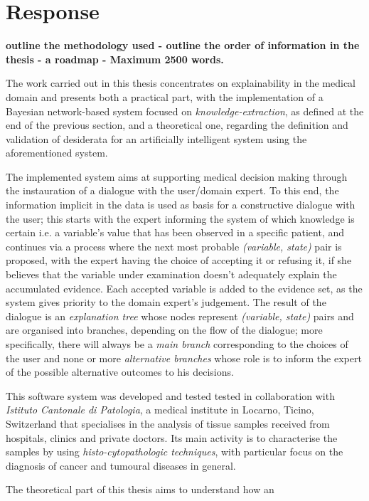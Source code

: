 
\section{Response}
\textbf{outline the methodology used - 
outline the order of information in the thesis - a roadmap - Maximum 2500 words.}

The work carried out in this thesis concentrates on explainability in the medical domain and presents both a practical part, with the implementation of a Bayesian network-based system focused on \textit{knowledge-extraction}, as defined at the end of the previous section, and a theoretical one, regarding the definition and validation of desiderata for an artificially intelligent system using the aforementioned system.

The implemented system aims at supporting medical decision making through the instauration of a dialogue with the user/domain expert.  To this end, the information implicit in the data is used as basis for a constructive dialogue with the user; this starts with the expert informing the system of which knowledge is certain i.e. a variable's value that has been observed in a specific patient, and continues via a process where the next most probable \textit{(variable, state)} pair is proposed, with the expert having the choice of accepting it or refusing it, if she believes that the variable under examination doesn't adequately explain the accumulated evidence.  Each accepted variable is added to the evidence set, as the system gives priority to the domain expert's judgement.
The result of the dialogue is an \textit{explanation tree} whose nodes represent \textit{(variable, state)} pairs and are organised into branches, depending on the flow of the dialogue; more specifically, there will always be a \textit{main branch} corresponding to the choices of the user and none or more \textit{alternative branches} whose role is to inform the expert of the possible alternative outcomes to his decisions.

This software system was developed and tested tested in collaboration with \textit{Istituto Cantonale di Patologia}, a medical institute in Locarno, Ticino, Switzerland that specialises in the analysis of tissue samples received from hospitals, clinics and private doctors.  Its main activity is to characterise the samples by using \textit{histo-cytopathologic techniques}, with particular focus on the diagnosis of cancer and tumoural diseases in general.

The theoretical part of this thesis aims to understand how an  